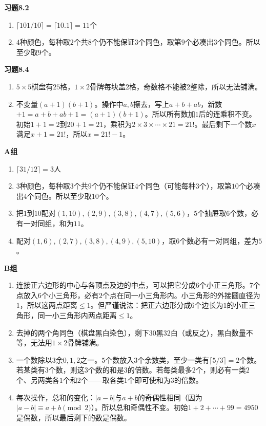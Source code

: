 \textbf{习题8.2}
\begin{enumerate}
\item $\lceil101/10\rceil=\lceil10.1\rceil=11$个
\item $4$种颜色，每种取$2$个共$8$个仍不能保证$3$个同色，取第$9$个必凑出$3$个同色。所以至少取$9$个。
\end{enumerate}

\textbf{习题8.4}
\begin{enumerate}
\item $5\times5$棋盘有$25$格，$1\times2$骨牌每块盖$2$格，奇数格不能被$2$整除，所以无法铺满。
\item 不变量$(a+1)(b+1)$。操作中$a,b$擦去，写上$a+b+ab$，新数$+1=a+b+ab+1=(a+1)(b+1)$。所以所有数加$1$后的连乘积不变。初始$1+1=2$到$20+1=21$，乘积为$2\times3\times\cdots\times21=21!$。最后剩下一个数$x$满足$x+1=21!$，所以$x=21!-1$。
\end{enumerate}

\textbf{A组}
\begin{enumerate}
\item $\lceil31/12\rceil=3$人
\item $3$种颜色，每种取$3$个共$9$个仍不能保证$4$个同色（可能每种$3$个），取第$10$个必凑出$4$个同色。所以至少取$10$个。
\item 把$1$到$10$配对$(1,10),(2,9),(3,8),(4,7),(5,6)$，$5$个抽屉取$6$个数，必有一对同组，和为$11$。
\item 配对$(1,6),(2,7),(3,8),(4,9),(5,10)$，取$6$个数必有一对同组，差为$5$。
\end{enumerate}

\textbf{B组}
\begin{enumerate}
\item 连接正六边形的中心与各顶点及边的中点，可以把它分成$6$个小正三角形。$7$个点放入$6$个小三角形，必有$2$个点在同一小三角形内。小三角形的外接圆直径为$1$，所以这两点距离$\le1$。但严谨说法：把正六边形分成$6$个边长为$1$的小正三角形，同一小三角形内两点距离$\le1$。
\item 去掉的两个角同色（棋盘黑白染色），剩下$30$黑$32$白（或反之），黑白数量不等，无法用$1\times2$骨牌铺满。
\item 一个数除以$3$余$0,1,2$之一。$5$个数放入$3$个余数类，至少一类有$\lceil5/3\rceil=2$个数。若某类有$3$个数，则这$3$个数的和是$3$的倍数。若每类最多$2$个，则必有一类$2$个、另两类各$1$个和$2$个——取各类$1$个即可使和为$3$的倍数。
\item 每次操作，总和的变化：$|a-b|$与$a+b$的奇偶性相同（因为$|a-b|\equiv a+b\pmod{2}$）。所以总和奇偶性不变。初始$1+2+\cdots+99=4950$是偶数，所以最后剩下的数是偶数。
\end{enumerate}


